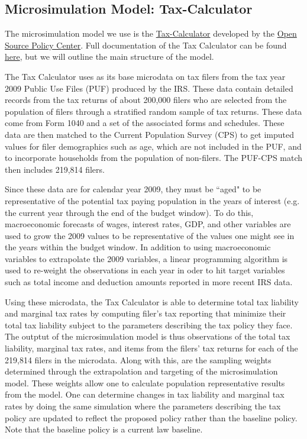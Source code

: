 \documentclass[letterpaper,12pt]{article}
\theoremstyle{definition}
\begin{document}
\begin{spacing}{1.5}
\section{Microsimulation Model: Tax-Calculator}\label{SecMicrosim}

The microsimulation model we use is the \href{http://taxcalc.readthedocs.org/en/latest/index.html}{Tax-Calculator} developed by the \href{http://www.ospc.org}{Open Source Policy Center}.  Full documentation of the Tax Calculator can be found \href{http://taxcalc.readthedocs.org/en/latest/index.html}{here}, but we will outline the main structure of the model.

The Tax Calculator uses as its base microdata on tax filers from the tax year 2009 Public Use Files (PUF) produced by the IRS.  These data contain detailed records from the tax returns of about 200,000 filers who are selected from the population of filers through a stratified random sample of tax returns.  These data come from Form 1040 and a set of the associated forms and schedules.  These data are then matched to the Current Population Survey (CPS) to get imputed values for filer demographics such as age, which are not included in the PUF, and to incorporate households from the population of non-filers.  The PUF-CPS match then includes 219,814 filers.  

Since these data are for calendar year 2009, they must be ``aged" to be representative of the potential tax paying population in the years of interest (e.g. the current year through the end of the budget window).  To do this, macroeconomic forecasts of wages, interest rates, GDP, and other variables are used to grow the 2009 values to be representative of the values one might see in the years within the budget window.  In addition to using macroeconomic variables to extrapolate the 2009 variables, a linear programming algorithm is used to re-weight the observations in each year in oder to hit target variables such as total income and deduction amounts reported in more recent IRS data.

Using these microdata, the Tax Calculator is able to determine total tax liability and marginal tax rates by computing filer's tax reporting that minimize their total tax liability subject to the parameters describing the tax policy they face.  The outptut of the microsimulation model is thus observations of the total tax liability, marginal tax rates, and items from the filers' tax returns for each of the 219,814 filers in the microdata.  Along with this, are the sampling weights determined through the extrapolation and targeting of the microsimulation model.  These weights allow one to calculate population representative results from the model.  One can determine changes in tax liability and marginal tax rates by doing the same simulation where the parameters describing the tax policy are updated to reflect the proposed policy rather than the baseline policy. Note that the baseline policy is a current law baseline.



\end{spacing}
\end{document}
